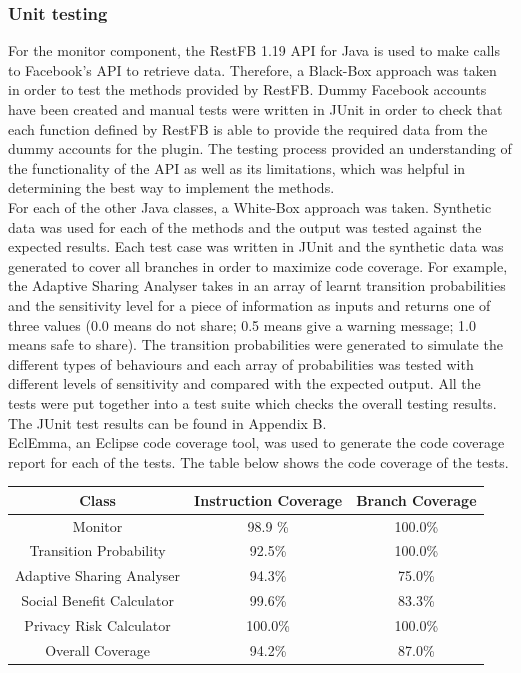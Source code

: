 \documentclass[a4paper,11pt]{article}
\begin{document}
\subsubsection {Unit testing}
For the monitor component, the RestFB 1.19 API\cite{RestFB} for Java is used to make calls to Facebook's API to retrieve data.  Therefore, a Black-Box approach was taken in order to test the methods provided by RestFB. Dummy Facebook accounts have been created and manual tests were written in JUnit\cite{JUnit} in order to check that each function defined by RestFB is able to provide the required data from the dummy accounts for the plugin. The testing process provided an understanding of the functionality of the API as well as its limitations, which was helpful in determining the best way to implement the methods.
\\
\indent For each of the other Java classes, a White-Box approach was taken. Synthetic data was used for each of the methods and the output was tested against the expected results. Each test case was written in JUnit and the synthetic data was generated to cover all branches in order to maximize code coverage. For example, the Adaptive Sharing Analyser takes in an array of learnt transition probabilities and the sensitivity level for a piece of information as inputs and returns one of three values (0.0 means do not share; 0.5 means give a warning message; 1.0 means safe to share). The transition probabilities were generated to simulate the different types of behaviours and each array of probabilities was tested with different levels of sensitivity and compared with the expected output. All the tests were put together into a test suite which checks the overall testing results. The JUnit test results can be found in Appendix B.
\\
\indent EclEmma\cite{EclEmma}, an Eclipse code coverage tool, was used to generate the code coverage report for each of the tests. The table below shows the code coverage of the tests.

 \begin{table}[H]
\centering
{} \label{tab:title2}
 \begin{tabular}{|c|c c|}
 \hline
 Class & Instruction Coverage & Branch Coverage\\

\hline
Monitor & 98.9 \% & 100.0\%\\
Transition Probability & 92.5\% & 100.0\%\\
Adaptive Sharing Analyser & 94.3\%& 75.0\%\\
Social Benefit Calculator &99.6\%& 83.3\%\\
Privacy Risk Calculator &100.0\%& 100.0\%\\
\hline
Overall Coverage &94.2\%&87.0\%\\
\hline
 \end{tabular}
 \end{table}
\end{document}
